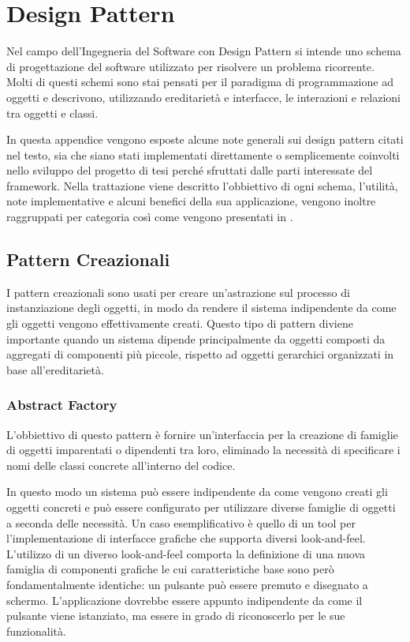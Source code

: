 
\chapter{Design Pattern}
\label{a:designpatterns}
Nel campo dell'Ingegneria del Software con Design Pattern si intende uno schema di progettazione del software utilizzato per risolvere un problema ricorrente.
Molti di questi schemi sono stai pensati per il paradigma di programmazione ad oggetti e descrivono, utilizzando ereditarietà e interfacce, le interazioni e relazioni tra oggetti e classi.

In questa appendice vengono esposte alcune note generali sui design pattern citati nel testo, sia che siano stati implementati direttamente o semplicemente coinvolti nello sviluppo del progetto di tesi perché sfruttati dalle parti interessate del framework.
Nella trattazione viene descritto l'obbiettivo di ogni schema, l'utilità, note implementative  e alcuni benefici della sua applicazione, vengono inoltre raggruppati per categoria così come vengono presentati in \cite{book:designpattern}.

\section{Pattern Creazionali}
I pattern creazionali sono usati per creare un'astrazione sul processo di instanziazione degli oggetti, in modo da rendere il sistema indipendente da come gli oggetti vengono effettivamente creati. Questo tipo di pattern diviene importante quando un sistema dipende principalmente da oggetti composti da aggregati di componenti più piccole, rispetto ad oggetti gerarchici organizzati in base all'ereditarietà.

\subsection{Abstract Factory}
\label{sub:abstractfactory}
L'obbiettivo di questo pattern è fornire un'interfaccia per la creazione di famiglie di oggetti imparentati o dipendenti tra loro, eliminado la necessità di specificare i nomi delle classi concrete all'interno del codice.

In questo modo un sistema può essere indipendente da come vengono creati gli oggetti concreti e può essere configurato per utilizzare diverse famiglie di oggetti a seconda delle necessità. Un caso esemplificativo è quello di un tool per l'implementazione di interfacce grafiche che supporta diversi look-and-feel. L'utilizzo di un diverso look-and-feel comporta la definizione di una nuova famiglia di componenti grafiche le cui caratteristiche base sono però fondamentalmente identiche: un pulsante può essere premuto e disegnato a schermo. L'applicazione dovrebbe essere appunto indipendente da come il pulsante viene istanziato, ma essere in grado di riconoscerlo per le sue funzionalità.


